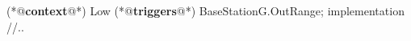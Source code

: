 \begin{Sbox}
\begin{minipage}{\columnwidth}
\begin{csource}
(*@\textbf{context}@*) Low {
 (*@\textbf{triggers}@*) BaseStationG.OutRange;
}implementation {
 //..}
\end{csource}
\end{minipage}
\end{Sbox}